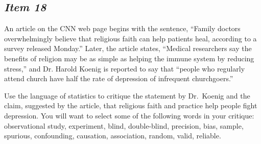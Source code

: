

\subsection{\textbf{\textit{Item 18}}}
An article on the CNN web page begins with the sentence, ``Family doctors overwhelmingly believe that religious faith can help patients heal, according to a survey released Monday.''  Later, the article states, ``Medical researchers say the benefits of religion may be as simple as helping the immune system by reducing stress,'' and Dr. Harold Koenig is reported to say that ``people who regularly attend church have half the rate of depression of infrequent churchgoers.''
  
Use the language of statistics to critique the statement by Dr.\ Koenig and the claim, suggested by the article, that religious faith and practice help people fight depression. You will want to select some of the following words in your critique: observational study, experiment, blind, double-blind, precision, bias, sample, spurious, confounding, causation, association, random, valid, reliable.

